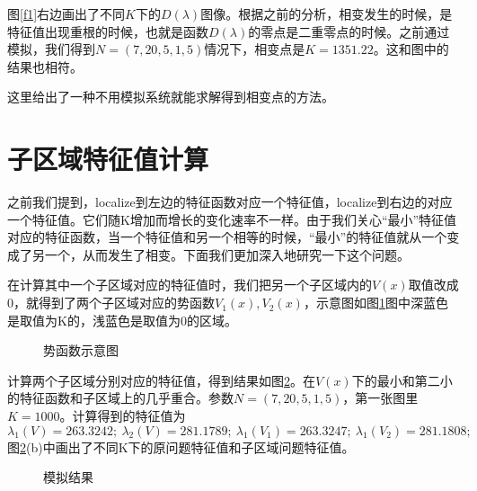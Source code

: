 \documentclass[12pt,a4paper]{article}
\begin{document}
图\ref{f1}右边画出了不同$K$下的$D(\lambda)$图像。根据之前的分析，相变发生的时候，是特征值出现重根的时候，也就是函数$D(\lambda)$的零点是二重零点的时候。之前通过模拟，我们得到$N=(7,20,5,1,5)$情况下，相变点是$K=1351.22$。这和图中的结果也相符。

这里给出了一种不用模拟系统就能求解得到相变点的方法。

\section*{子区域特征值计算}

之前我们提到，localize到左边的特征函数对应一个特征值，localize到右边的对应一个特征值。它们随K增加而增长的变化速率不一样。由于我们关心“最小”特征值对应的特征函数，当一个特征值和另一个相等的时候，“最小”的特征值就从一个变成了另一个，从而发生了相变。下面我们更加深入地研究一下这个问题。

在计算其中一个子区域对应的特征值时，我们把另一个子区域内的$V(x)$取值改成0，就得到了两个子区域对应的势函数$V_1(x), V_2(x)$，示意图如图\ref{f5}图中深蓝色是取值为K的，浅蓝色是取值为0的区域。
\begin{figure}[h]
\centering
{}
\caption{势函数示意图}
\label{f5}
\end{figure}

计算两个子区域分别对应的特征值，得到结果如图\ref{f6}。在$V(x)$下的最小和第二小的特征函数和子区域上的几乎重合。参数$N=(7,20,5,1,5)$，第一张图里$K=1000$。计算得到的特征值为
$$ \lambda_1(V) = 263.3242; \ \lambda_2(V) = 281.1789; \ \lambda_1(V_1) = 263.3247; \ \lambda_1(V_2) = 281.1808; $$
图\ref{f6}(b)中画出了不同K下的原问题特征值和子区域问题特征值。
\begin{figure}[h]
\centering
{}
\caption{模拟结果}
\label{f6}
\end{figure}
\end{document}
